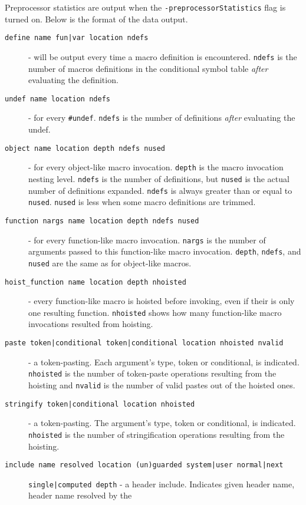\documentclass{article}
\begin{document}
Preprocessor statistics are output when the \verb"-preprocessorStatistics"
flag is turned on.  Below is the format of the data output.

\begin{description}
\item[\texttt{define name fun|var location ndefs}] - will be output every
  time a macro definition is encountered.  \verb"ndefs" is the number of
  macros definitions in the conditional symbol table \emph{after}
  evaluating the definition.
\item[\texttt{undef name location ndefs}] - for every \verb"#undef". \verb"ndefs" is the
  number of definitions \emph{after} evaluating the undef.
\item[\texttt{object name location depth ndefs nused}] - for every
  object-like macro invocation.  \verb"depth" is the macro invocation
  nesting level.  \verb"ndefs" is the number of definitions, but \verb"nused" is
  the actual number of definitions expanded.  \verb"ndefs" is always
  greater than or equal to \verb"nused".  \verb"nused" is less when some macro
  definitions are trimmed.
\item[\texttt{function nargs name location depth ndefs nused}] - for every
  function-like macro invocation.  \verb"nargs" is the number of arguments
  passed to this function-like macro invocation.  \verb"depth", \verb"ndefs",
  and \verb"nused" are the same as for object-like macros.
\item[\texttt{hoist\_function name location depth nhoisted}] - every function-like
  macro is hoisted before invoking, even if their is only one
  resulting function.  \verb"nhoisted" shows how many function-like macro
  invocations resulted from hoisting.
\item[\texttt{paste token|conditional token|conditional location
    nhoisted nvalid}] - a token-pasting.  Each argument's type, token
  or conditional, is indicated.  \verb"nhoisted" is the number of
  token-paste operations resulting from the hoisting and \verb"nvalid"
  is the number of valid pastes out of the hoisted ones.
\item[\texttt{stringify token|conditional location nhoisted}] - a
  token-pasting.  The argument's type, token or conditional, is
  indicated.  \verb"nhoisted" is the number of stringification operations
  resulting from the hoisting.
\item[\texttt{include name resolved location (un)guarded system|user
    normal|next}] \texttt{single|computed depth} - a header include.
  Indicates given header name, header name resolved by the

\end{description}
\end{document}
